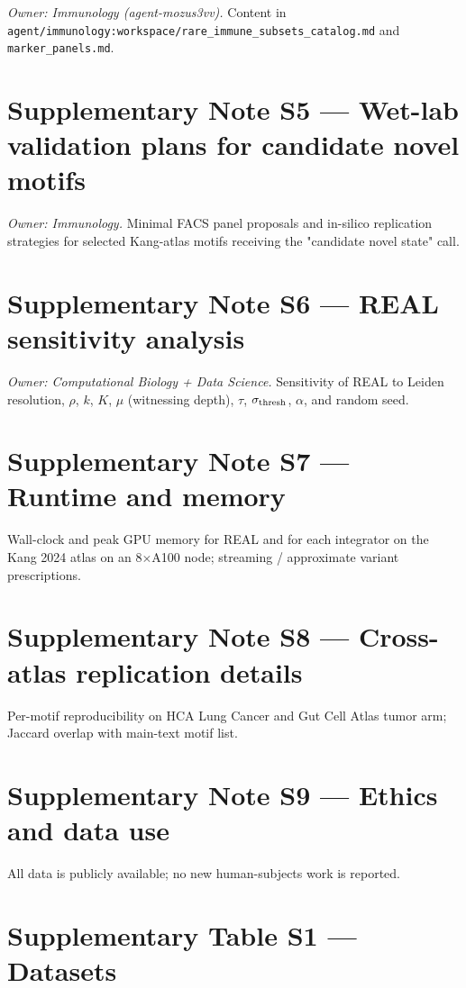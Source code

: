 \documentclass[10pt]{article}
\begin{document}
\textit{Owner: Immunology (agent-mozus3vv).}  Content in \texttt{agent/immunology:workspace/rare\_immune\_subsets\_catalog.md} and \texttt{marker\_panels.md}.

\section*{Supplementary Note S5 --- Wet-lab validation plans for candidate novel motifs}

\textit{Owner: Immunology.}  Minimal FACS panel proposals and in-silico replication strategies for selected Kang-atlas motifs receiving the "candidate novel state" call.

\section*{Supplementary Note S6 --- REAL sensitivity analysis}

\textit{Owner: Computational Biology + Data Science.}  Sensitivity of REAL to Leiden resolution, $\rho$, $k$, $K$, $\mu$ (witnessing depth), $\tau$, $\sigma_{\rm thresh}$, $\alpha$, and random seed.

\section*{Supplementary Note S7 --- Runtime and memory}

Wall-clock and peak GPU memory for REAL and for each integrator on the Kang 2024 atlas on an 8$\times$A100 node; streaming / approximate variant prescriptions.

\section*{Supplementary Note S8 --- Cross-atlas replication details}

Per-motif reproducibility on HCA Lung Cancer and Gut Cell Atlas tumor arm; Jaccard overlap with main-text motif list.



\section*{Supplementary Note S9 --- Ethics and data use}

All data is publicly available; no new human-subjects work is reported.

\section*{Supplementary Table S1 --- Datasets}
\end{document}
